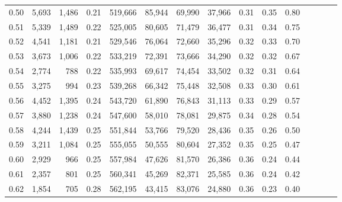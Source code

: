\begin{tabular}{rrrcrrrrrrrrrrr}
0.50 &   5,693 &  1,486 &                                       0.21 &  519,666 &   85,944 &   69,990 &   37,966 &  0.31 &  0.35 &                         0.80 \\
0.51 &   5,339 &  1,489 &                                       0.22 &  525,005 &   80,605 &   71,479 &   36,477 &  0.31 &  0.34 &                         0.75 \\
0.52 &   4,541 &  1,181 &                                       0.21 &  529,546 &   76,064 &   72,660 &   35,296 &  0.32 &  0.33 &                         0.70 \\
0.53 &   3,673 &  1,006 &                                       0.22 &  533,219 &   72,391 &   73,666 &   34,290 &  0.32 &  0.32 &                         0.67 \\
0.54 &   2,774 &    788 &                                       0.22 &  535,993 &   69,617 &   74,454 &   33,502 &  0.32 &  0.31 &                         0.64 \\
0.55 &   3,275 &    994 &                                       0.23 &  539,268 &   66,342 &   75,448 &   32,508 &  0.33 &  0.30 &                         0.61 \\
0.56 &   4,452 &  1,395 &                                       0.24 &  543,720 &   61,890 &   76,843 &   31,113 &  0.33 &  0.29 &                         0.57 \\
0.57 &   3,880 &  1,238 &                                       0.24 &  547,600 &   58,010 &   78,081 &   29,875 &  0.34 &  0.28 &                         0.54 \\
0.58 &   4,244 &  1,439 &                                       0.25 &  551,844 &   53,766 &   79,520 &   28,436 &  0.35 &  0.26 &                         0.50 \\
0.59 &   3,211 &  1,084 &                                       0.25 &  555,055 &   50,555 &   80,604 &   27,352 &  0.35 &  0.25 &                         0.47 \\
0.60 &   2,929 &    966 &                                       0.25 &  557,984 &   47,626 &   81,570 &   26,386 &  0.36 &  0.24 &                         0.44 \\
0.61 &   2,357 &    801 &                                       0.25 &  560,341 &   45,269 &   82,371 &   25,585 &  0.36 &  0.24 &                         0.42 \\
0.62 &   1,854 &    705 &                                       0.28 &  562,195 &   43,415 &   83,076 &   24,880 &  0.36 &  0.23 &                         0.40 \\

\end{tabular}
